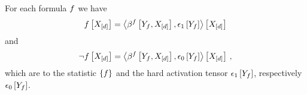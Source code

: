 \begin{theorem}
    \label{the:formulaAsCANetwork}
    For each formula $f$ we have
    \begin{align*}
        f\left[X_{[d]}\right]
        = \left\langle \beta^{f}\left[Y_{f},X_{[d]}\right],\epsilon_1\left[Y_{f}\right]\right\rangle \left[ X_{[d]} \right]
    \end{align*}
    and
    \begin{align*}
        \lnot f\left[X_{[d]}\right]
        = \left\langle \beta^{f}\left[Y_{f},X_{[d]}\right],\epsilon_0\left[Y_{f}\right]\right\rangle \left[ X_{[d]} \right] \, ,
    \end{align*}
    which are \ComputationActivationNetworks{} to the statistic $\{f\}$ and the hard activation tensor $\epsilon_1\left[Y_{f}\right]$, respectively $\epsilon_0\left[Y_{f}\right]$.
\end{theorem}
